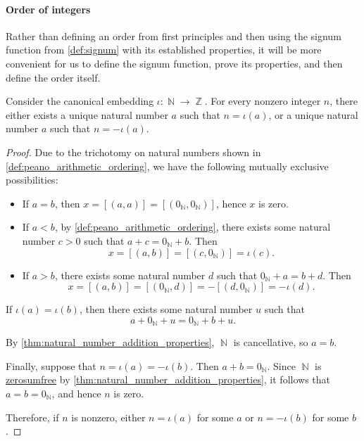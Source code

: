 \paragraph{Order of integers}

Rather than defining an order from first principles and then using the signum function from \cref{def:signum} with its established properties, it will be more convenient for us to define the signum function, prove its properties, and then define the order itself.

\begin{lemma}\label{thm:integer_signum_lemma}
  Consider the canonical embedding \( \iota: \BbbN \to \BbbZ \). For every nonzero integer \( n \), there either exists a unique natural number \( a \) such that \( n = \iota(a) \), or a unique natural number \( a \) such that \( n = -\iota(a) \).
\end{lemma}
\begin{proof}
  \ExistenceSubProof Due to the trichotomy on natural numbers shown in \cref{def:peano_arithmetic_ordering}, we have the following mutually exclusive possibilities:
  \begin{itemize}
    \item If \( a = b \), then \( x = [(a, a)] = [(0_\BbbN, 0_\BbbN)] \), hence \( x \) is zero.
    \item If \( a < b \), by \cref{def:peano_arithmetic_ordering}, there exists some natural number \( c > 0 \) such that \( a + c = 0_\BbbN + b \). Then
    \begin{equation*}
      x = [(a, b)] = [(c, 0_\BbbN)] = \iota(c).
    \end{equation*}

    \item If \( a > b \), there exists some natural number \( d \) such that \( 0_\BbbN + a = b + d \). Then
    \begin{equation*}
      x = [(a, b)] = [(0_\BbbN, d)] = -[(d, 0_\BbbN)] = -\iota(d).
    \end{equation*}
  \end{itemize}

  \UniquenessSubProof If \( \iota(a) = \iota(b) \), then there exists some natural number \( u \) such that
  \begin{equation*}
     a + 0_\BbbN + u = 0_\BbbN + b + u.
  \end{equation*}

  By \cref{thm:natural_number_addition_properties}, \( \BbbN \) is cancellative, so \( a = b \).

   Finally, suppose that \( n = \iota(a) = -\iota(b) \). Then \( a + b = 0_\BbbN \). Since \( \BbbN \) is \hyperref[def:zerosumfree]{zerosumfree} by \cref{thm:natural_number_addition_properties}, it follows that \( a = b = 0_\BbbN \), and hence \( n \) is zero.

  Therefore, if \( n \) is nonzero, either \( n = \iota(a) \) for some \( a \) or \( n = -\iota(b) \) for some \( b \).
\end{proof}

